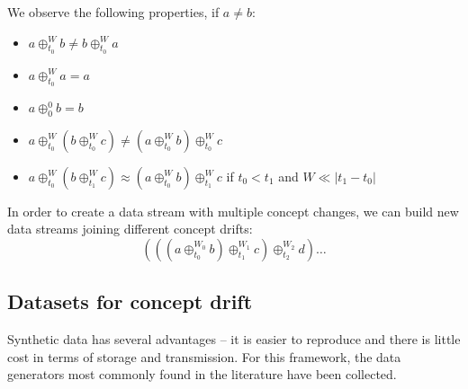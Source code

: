 We observe the following properties, if $a \ne b$:
\begin{itemize}
 \item $a \oplus^{W}_{t_0} b \neq b \oplus^{W}_{t_0} a$
 \item $a \oplus^{W}_{t_0} a = a$
 \item $a \oplus^{0}_{0} b = b$
 \item $a \oplus^{W}_{t_0} ( b \oplus^{W}_{t_0} c) \neq (a \oplus^{W}_{t_0}  b)
	 \oplus^{W}_{t_0} c$
 \item $a \oplus^{W}_{t_0} ( b \oplus^{W}_{t_1} c) \approx (a \oplus^{W}_{t_0}  b)
	 \oplus^{W}_{t_1} c$ if $t_0<t_1$ and $W \ll |t_1-t_0|$
\end{itemize}
In order to create a data stream with multiple concept changes, we can build new 
data streams joining different concept drifts:
$$( ( (a \oplus^{W_0}_{t_0}  b) \oplus^{W_1}_{t_1} c) \oplus^{W_2}_{t_2} d ) \ldots $$ 



\subsection{Datasets for concept drift}
\label{datasets}
Synthetic data has several advantages \--- it is easier to reproduce and there is 
little cost in terms of storage and transmission. For this framework, 
the data generators most commonly found in the literature have been collected.

